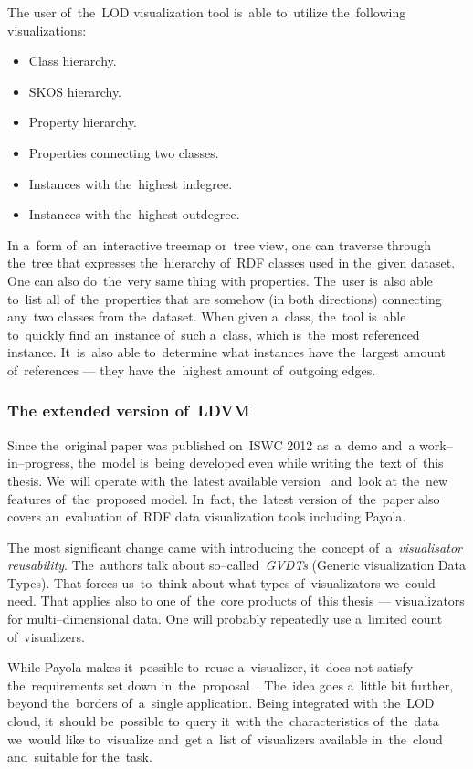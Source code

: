 The user of~the~LOD visualization tool is~able to~utilize the~following 
visualizations:

\begin{itemize}
\item Class hierarchy.
\item SKOS hierarchy.
\item Property hierarchy.
\item Properties connecting two classes.
\item Instances with the~highest indegree.
\item Instances with the~highest outdegree.
\end{itemize}

In a~form of~an~interactive treemap or~tree view, one 
can traverse through the~tree that expresses the~hierarchy of~RDF classes used 
in the~given dataset. One can also do~the~very same thing with properties. The~user is~also able to~list all of~the~properties that are somehow (in both directions)
connecting any~two classes from the~dataset. When given a~class, the~tool is~able to~quickly find an~instance of~such a~class, which is~the~most referenced
instance. It~is~also able to~determine what instances have the~largest amount of~references
--- they have the~highest amount of~outgoing
edges.

\subsubsection{The extended version of~LDVM}
Since the~original paper was published on~ISWC 2012 as~a~demo and~a
work--in--progress, the~model is~being developed even while writing the~text of~this thesis. We~will operate with the~latest available version~\cite{ldvm2} and~look 
at the~new features of~the~proposed model. In~fact, the~latest version of~the~paper also covers an~evaluation of~RDF data visualization tools including 
Payola.

The most significant change came with introducing the~concept of~a~\emph{visualisator 
reusability}. The~authors talk about so--called~\emph{GVDTs} (Generic visualization Data Types).
That forces us~to~think about what types of~visualizators we~could need. That applies also to
one of~the~core products of~this thesis --- visualizators for multi--dimensional data.
One will probably repeatedly use a~limited count of~visualizers.

While Payola makes it~possible to~reuse a~visualizer, it~does not satisfy the~requirements set down in~the~proposal~\cite{ldvm2}. The~idea goes a~little bit 
further, beyond the~borders of~a~single application. Being integrated with the~LOD cloud, it~should be~possible to~query it~with the~characteristics of~the~data we~would like to~visualize and~get a~list of~visualizers 
available in~the~cloud and~suitable for the~task.

